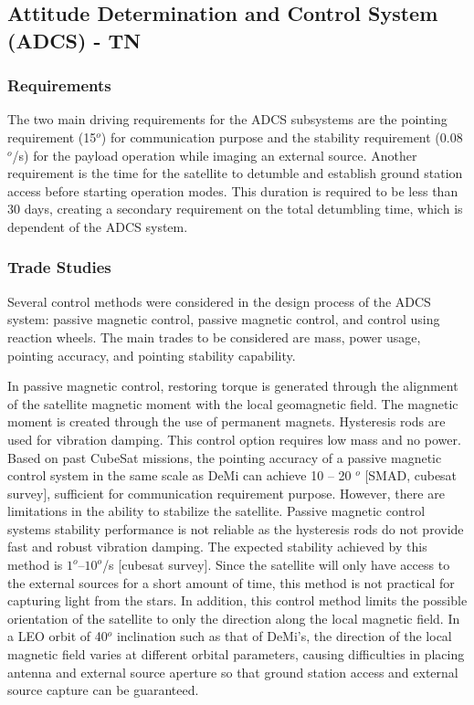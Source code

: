 \documentclass[12pt]{article}
\begin{document}
		\subsection{Attitude Determination and Control System (ADCS) - TN} 
			\subsubsection{Requirements}
		
				The two main driving requirements for the ADCS subsystems are the 			pointing requirement (15$^o$) for communication purpose and the stability requirement (0.08$^o$/s) for the payload operation while imaging an external source. Another requirement is the time for the satellite to detumble and establish ground station access before starting operation modes. This duration is required to be less than 30 days, creating a secondary requirement on the total detumbling time, which is dependent of the ADCS system. 
			\subsubsection{Trade Studies}
			Several control methods were considered in the design process of the ADCS system: passive magnetic control, passive magnetic control, and control using reaction wheels. The main trades to be considered are mass, power usage, pointing accuracy, and pointing stability capability. 

In passive magnetic control, restoring torque is generated through the alignment of the satellite magnetic moment with the local geomagnetic field. The magnetic moment is created through the use of permanent magnets. Hysteresis rods are used for vibration damping. This control option requires low mass and no power. Based on past CubeSat missions, the pointing accuracy of a passive magnetic control system in the same scale as DeMi can achieve 10 – 20 $^o$ [SMAD, cubesat survey], sufficient for communication requirement purpose. However, there are limitations in the ability to stabilize the satellite. Passive magnetic control systems stability performance is not reliable as the hysteresis rods do not provide fast and robust vibration damping. The expected stability achieved by this method is $1^o – 10 ^o$/s [cubesat survey]. Since the satellite will only have access to the external sources for a short amount of time, this method is not practical for capturing light from the stars. In addition, this control method limits the possible orientation of the satellite to only the direction along the local magnetic field. In a LEO orbit of 40$^o$ inclination such as that of DeMi’s, the direction of the local magnetic field varies at different orbital parameters, causing difficulties in placing antenna and external source aperture so that ground station access and external source capture can be guaranteed. 
\end{document}
